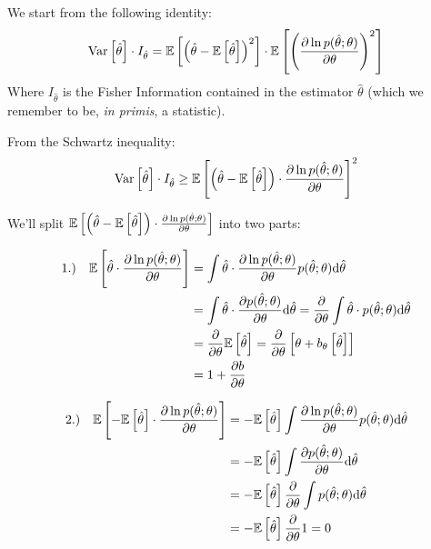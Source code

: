 \begin{example}
	We start from the following identity:
	\[
	\operatorname{Var}\left[\hat\theta\right]\cdot I_{\hat\theta} = \mathbb{E}\left[\left(\hat\theta-\mathbb{E}\left[\hat\theta\right]\right)^2\right]\cdot\mathbb{E}\left[\left(\frac{\partial\ln p(\hat\theta;\theta)}{\partial\theta}\right)^2\right]
	\]
	Where $I_{\hat\theta}$ is the Fisher Information contained in the estimator $\hat\theta$ (which we remember to be, \emph{in primis}, a statistic).
	
	From the Schwartz inequality: 
	\[
	\operatorname{Var}\left[\hat\theta\right]\cdot I_{\hat\theta}\geq \mathbb{E}\left[\left(\hat\theta-\mathbb{E}\left[\hat\theta\right]\right)\cdot\frac{\partial\ln p(\hat\theta;\theta)}{\partial\theta}\right]^2
	\]
	
	We'll split $\mathbb{E}\left[\left(\hat\theta-\mathbb{E}\left[\hat\theta\right]\right)\cdot\frac{\partial\ln p(\hat\theta;\theta)}{\partial\theta}\right]$ into two parts:
	
	\begin{align*}
		1.) \quad \mathbb{E}\left[\hat\theta\cdot\frac{\partial\ln p(\hat\theta;\theta)}{\partial\theta}\right] &= \int \hat\theta\cdot\frac{\partial\ln p(\hat\theta;\theta)}{\partial\theta} p(\hat\theta;\theta)\mathrm{d} \hat\theta \\
		&= \int \hat\theta\cdot\frac{\partial p(\hat\theta;\theta)}{\partial\theta}\mathrm{d} \hat\theta = \frac{\partial}{\partial\theta}\int \hat\theta\cdot p(\hat\theta;\theta)\mathrm{d} \hat\theta \\
		&=\frac{\partial}{\partial\theta}\mathbb{E}\left[\hat\theta\right] = \frac{\partial}{\partial\theta}\left[\theta+b_\theta\left[\hat\theta\right]\right]\\
		&= 1 + \frac{\partial b}{\partial\theta}
	\end{align*}
	
	\begin{align*}
		2.) \quad \mathbb{E}\left[-\mathbb{E}\left[\hat\theta\right]\cdot\frac{\partial\ln p(\hat\theta;\theta)}{\partial\theta}\right] &= -\mathbb{E}\left[\hat\theta\right]\int \frac{\partial\ln p(\hat\theta;\theta)}{\partial\theta} p(\hat\theta;\theta)\mathrm{d} \hat\theta \\
		&= -\mathbb{E}\left[\hat\theta\right]\int\frac{\partial p(\hat\theta;\theta)}{\partial\theta}\mathrm{d} \hat\theta \\
		&= -\mathbb{E}\left[\hat\theta\right]\frac{\partial}{\partial\theta}\int p(\hat\theta;\theta)\mathrm{d} \hat\theta \\
		&=-\mathbb{E}\left[\hat\theta\right]\frac{\partial}{\partial\theta}1 = 0
	\end{align*}
	

\end{example}
